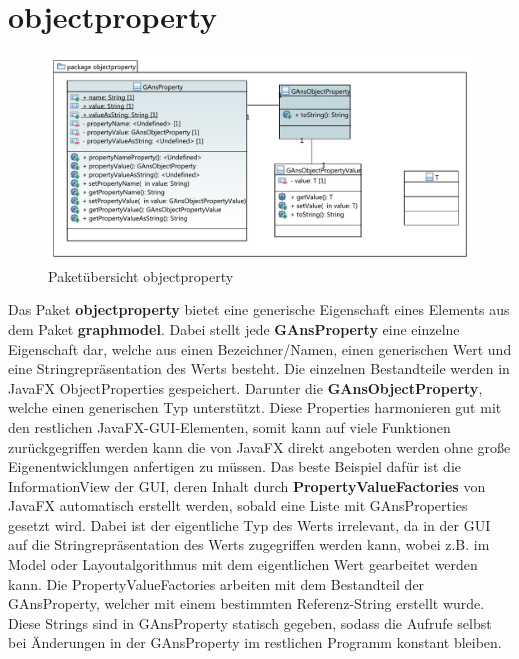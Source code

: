 \newpage

\section{objectproperty}

\begin{figure}[hb]
  \centering
  \includegraphics[width=380pt]{resourcen/objectproperty.pdf}
  \caption{Paketübersicht objectproperty}
  \label{fig:packge_objectproperty}
\end{figure}

Das Paket \textbf{objectproperty} bietet eine generische Eigenschaft eines Elements aus dem Paket \textbf{graphmodel}. Dabei stellt jede \textbf{GAnsProperty} eine einzelne Eigenschaft dar, welche aus einen Bezeichner/Namen, einen generischen Wert und eine Stringrepräsentation des Werts besteht. Die einzelnen Bestandteile werden in JavaFX ObjectProperties gespeichert. Darunter die \textbf{GAnsObjectProperty}, welche einen generischen Typ unterstützt. Diese Properties harmonieren gut mit den restlichen JavaFX-GUI-Elementen, somit kann auf viele Funktionen zurückgegriffen werden kann die von JavaFX direkt angeboten werden ohne große Eigenentwicklungen anfertigen zu müssen. Das beste Beispiel dafür ist die InformationView der GUI, deren Inhalt durch \textbf{PropertyValueFactories} von JavaFX automatisch erstellt werden, sobald eine Liste mit GAnsProperties gesetzt wird. Dabei ist der eigentliche Typ des Werts irrelevant, da in der GUI auf die Stringrepräsentation des Werts zugegriffen werden kann, wobei z.B. im Model oder Layoutalgorithmus mit dem eigentlichen Wert gearbeitet werden kann. Die PropertyValueFactories arbeiten mit dem Bestandteil der GAnsProperty, welcher mit einem bestimmten Referenz-String erstellt wurde. Diese Strings sind in GAnsProperty statisch gegeben, sodass die Aufrufe selbst bei Änderungen in der GAnsProperty im restlichen Programm konstant bleiben.

